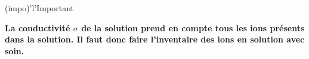 \documentclass[../main/main.tex]{subfiles}
\begin{document}
{	\begin{tcb}(impo)'l'{Important}
		\begin{center}
			\bfseries
			La conductivité $\sigma$ de la solution prend en compte tous les ions
			présents dans la solution. Il faut donc faire l'inventaire des ions en
			solution avec soin.
		\end{center}
	\end{tcb}

}

\setcounter{section}{2}
\end{document}
